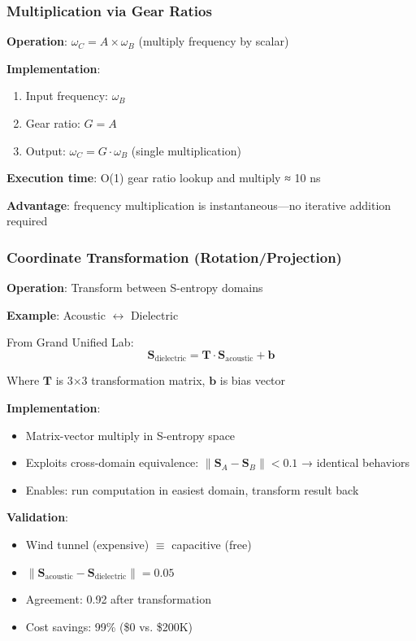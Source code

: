 \documentclass[11pt,a4paper]{article}
\begin{document}
\subsubsection{Multiplication via Gear Ratios}

\textbf{Operation}: $\omega_C = A \times \omega_B$ (multiply frequency by scalar)

\textbf{Implementation}:
\begin{enumerate}
\item Input frequency: $\omega_B$
\item Gear ratio: $G = A$
\item Output: $\omega_C = G \cdot \omega_B$ (single multiplication)
\end{enumerate}

\textbf{Execution time}: O(1) gear ratio lookup and multiply ≈ 10 ns

\textbf{Advantage}: frequency multiplication is instantaneous—no iterative addition required

\subsubsection{Coordinate Transformation (Rotation/Projection)}

\textbf{Operation}: Transform between S-entropy domains

\textbf{Example}: Acoustic $\leftrightarrow$ Dielectric

From Grand Unified Lab:
\begin{equation}
\mathbf{S}_{\text{dielectric}} = \mathbf{T} \cdot \mathbf{S}_{\text{acoustic}} + \mathbf{b}
\end{equation}

Where $\mathbf{T}$ is 3×3 transformation matrix, $\mathbf{b}$ is bias vector

\textbf{Implementation}:
\begin{itemize}
\item Matrix-vector multiply in S-entropy space
\item Exploits cross-domain equivalence: $\|\mathbf{S}_A - \mathbf{S}_B\| < 0.1$ → identical behaviors
\item Enables: run computation in easiest domain, transform result back
\end{itemize}

\textbf{Validation}:
\begin{itemize}
\item Wind tunnel (expensive) $\equiv$ capacitive (free)
\item $\|\mathbf{S}_{\text{acoustic}} - \mathbf{S}_{\text{dielectric}}\| = 0.05$
\item Agreement: 0.92 after transformation
\item Cost savings: 99\% (\$0 vs. \$200K)
\end{itemize}
\end{document}
